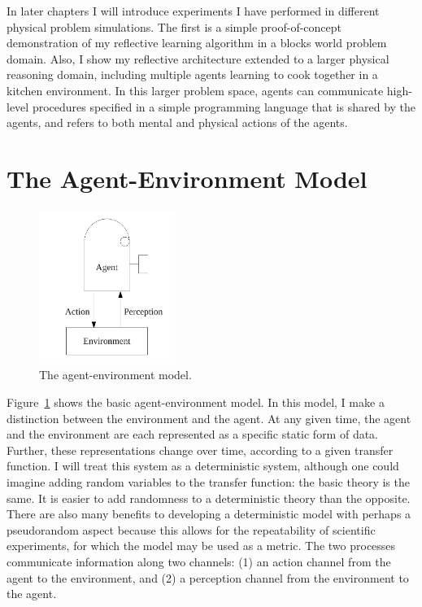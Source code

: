 In later chapters I will introduce experiments I have performed in
different physical problem simulations.  The first is a simple
proof-of-concept demonstration of my reflective learning algorithm in
a blocks world problem domain.  Also, I show my reflective
architecture extended to a larger physical reasoning domain, including
multiple agents learning to cook together in a kitchen environment.
In this larger problem space, agents can communicate high-level
procedures specified in a simple programming language that is shared
by the agents, and refers to both mental and physical actions of the
agents.

\section{The Agent-Environment Model}

\begin{figure}[bth]
  \center
  \includegraphics[height=5cm]{gfx/agent_environment}
  \caption[The agent-environment model]{The agent-environment model.}
  \label{fig:agent_environment}
\end{figure}

Figure~\ref{fig:agent_environment} shows the basic agent-environment
model.  In this model, I make a distinction between the environment
and the agent.  At any given time, the agent and the environment are
each represented as a specific static form of data.  Further, these
representations change over time, according to a given transfer
function.  I will treat this system as a deterministic system,
although one could imagine adding random variables to the transfer
function: the basic theory is the same.  It is easier to add
randomness to a deterministic theory than the opposite.  There are
also many benefits to developing a deterministic model with perhaps a
pseudorandom aspect because this allows for the repeatability of
scientific experiments, for which the model may be used as a metric.
The two processes communicate information along two channels: (1) an
action channel from the agent to the environment, and (2) a perception
channel from the environment to the agent.


